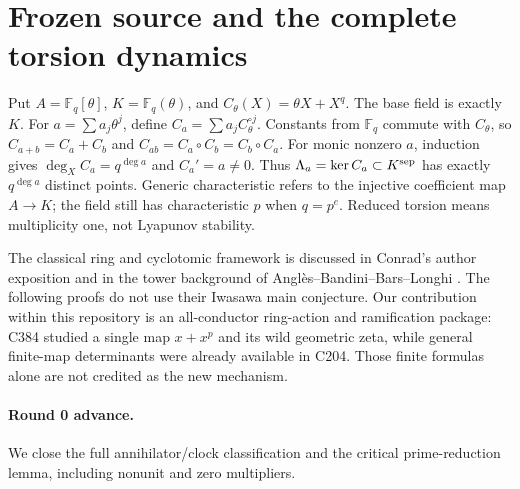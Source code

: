 \documentclass[10pt]{article}
\newcommand{\F}{\mathbb F}
\begin{document}
\section{Frozen source and the complete torsion dynamics}
Put $A=\F_q[\theta]$, $K=\F_q(\theta)$, and
$C_\theta(X)=\theta X+X^q$. The base field is exactly $K$.
For $a=\sum a_j\theta^j$, define $C_a=\sum a_j C_\theta^{\circ j}$.
Constants from $\F_q$ commute with $C_\theta$, so
$C_{a+b}=C_a+C_b$ and $C_{ab}=C_a\circ C_b=C_b\circ C_a$.
For monic nonzero $a$, induction gives $\deg_X C_a=q^{\deg a}$ and
$C_a'=a\ne0$. Thus $\Lambda_a=\ker C_a\subset K^{\rm sep}$ has exactly
$q^{\deg a}$ distinct points. Generic characteristic refers to the injective
coefficient map $A\to K$; the field still has characteristic $p$ when
$q=p^e$. Reduced torsion means multiplicity one, not Lyapunov stability.

The classical ring and cyclotomic framework is discussed in Conrad's
author exposition \cite{Conrad} and in the tower background of
Angl\`es--Bandini--Bars--Longhi \cite{ABBL}. The following proofs do not use
their Iwasawa main conjecture. Our contribution within this repository is
an all-conductor ring-action and ramification package: C384 studied a
single map $x+x^p$ and its wild geometric zeta, while general finite-map
determinants were already available in C204. Those finite formulas alone
are not credited as the new mechanism.

\paragraph{Round 0 advance.}
We close the full annihilator/clock classification and the critical
prime-reduction lemma, including nonunit and zero multipliers.
\end{document}
